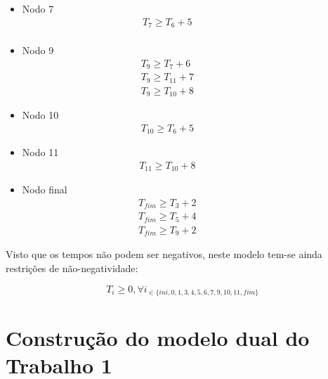 \begin{itemize}
\item Nodo 7
\begin{align*}
       T_7 \ge T_6 + 5  &         &         &         &         &         &\\
	\end{align*}


\item Nodo 9
\begin{align*}
T_9 \ge T_7 + 6   &         &         &         &         &         &\\
T_9 \ge T_{11} + 7 &         &         &         &         &         &\\
T_9 \ge T_{10} + 8 &         &         &         &         &         &
	\end{align*}


\item Nodo 10
\begin{align*}
		T_{10} \ge T_6 + 5 &         &         &         &         &         &
	\end{align*}

\item Nodo 11
\begin{align*}
		T_{11} \ge T_{10} + 8 &         &         &         &         &         &	
\end{align*}



\item Nodo final
\begin{align*}
		T_{fim} \ge T_3 + 2 &         &         &         &         &         &\\
T_{fim} \ge T_5 + 4 &         &         &         &         &         &\\
T_{fim} \ge T_9 + 2 &         &         &         &         &         &
	\end{align*}


\end{itemize}


Visto que os tempos não podem ser negativos, neste modelo tem-se ainda
restrições de não-negatividade:

\begin{displaymath} T_{i} \geq 0, \forall i_{\in\{ini, 0, 1, 3,
	4,5,6,7,9,10,11,fim\}} \end{displaymath}


\section{Construção do modelo dual do Trabalho 1}


